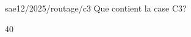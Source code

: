 \begin{question}{sae12/2025/routage/c3}
  Que contient la case C3?
  \begin{reponses}{4}{0}
  \end{reponses}
\end{question}
